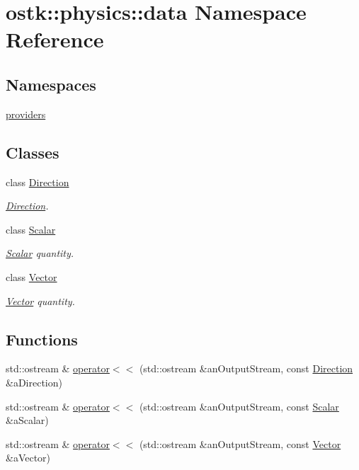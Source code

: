 \hypertarget{namespaceostk_1_1physics_1_1data}{}\section{ostk\+:\+:physics\+:\+:data Namespace Reference}
\label{namespaceostk_1_1physics_1_1data}
\subsection*{Namespaces}
\begin{DoxyCompactItemize}
\item 
 \hyperlink{namespaceostk_1_1physics_1_1data_1_1providers}{providers}
\end{DoxyCompactItemize}
\subsection*{Classes}
\begin{DoxyCompactItemize}
\item 
class \hyperlink{classostk_1_1physics_1_1data_1_1_direction}{Direction}
\begin{DoxyCompactList}\small\item\em \hyperlink{classostk_1_1physics_1_1data_1_1_direction}{Direction}. \end{DoxyCompactList}\item 
class \hyperlink{classostk_1_1physics_1_1data_1_1_scalar}{Scalar}
\begin{DoxyCompactList}\small\item\em \hyperlink{classostk_1_1physics_1_1data_1_1_scalar}{Scalar} quantity. \end{DoxyCompactList}\item 
class \hyperlink{classostk_1_1physics_1_1data_1_1_vector}{Vector}
\begin{DoxyCompactList}\small\item\em \hyperlink{classostk_1_1physics_1_1data_1_1_vector}{Vector} quantity. \end{DoxyCompactList}\end{DoxyCompactItemize}
\subsection*{Functions}
\begin{DoxyCompactItemize}
\item 
std\+::ostream \& \hyperlink{namespaceostk_1_1physics_1_1data_a55120922223397f7b4b8ae23e9fd6d12}{operator$<$$<$} (std\+::ostream \&an\+Output\+Stream, const \hyperlink{classostk_1_1physics_1_1data_1_1_direction}{Direction} \&a\+Direction)
\item 
std\+::ostream \& \hyperlink{namespaceostk_1_1physics_1_1data_a702ce7315b53edd862a42b5f2c980e71}{operator$<$$<$} (std\+::ostream \&an\+Output\+Stream, const \hyperlink{classostk_1_1physics_1_1data_1_1_scalar}{Scalar} \&a\+Scalar)
\item 
std\+::ostream \& \hyperlink{namespaceostk_1_1physics_1_1data_a117b206d735caf86f42a8e3491342e19}{operator$<$$<$} (std\+::ostream \&an\+Output\+Stream, const \hyperlink{classostk_1_1physics_1_1data_1_1_vector}{Vector} \&a\+Vector)
\end{DoxyCompactItemize}


